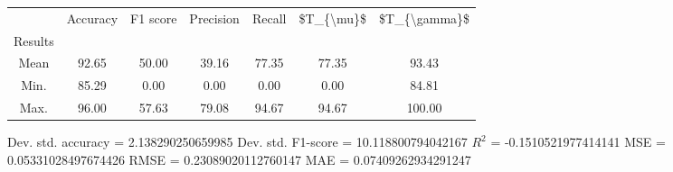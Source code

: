 \begin{tabular}{|c|c|c|c|c|c|c|}
\toprule
{} &  Accuracy &  F1 score &  Precision &  Recall &  \$T\_\{\textbackslash mu\}\$ &  \$T\_\{\textbackslash gamma\}\$ \\
Results &           &           &            &         &            &               \\
\hline
Mean    &     92.65 &     50.00 &      39.16 &   77.35 &      77.35 &         93.43 \\
Min.    &     85.29 &      0.00 &       0.00 &    0.00 &       0.00 &         84.81 \\
Max.    &     96.00 &     57.63 &      79.08 &   94.67 &      94.67 &        100.00 \\
\bottomrule
\end{tabular}

 Dev. std. accuracy = 2.138290250659985
 Dev. std. F1-score = 10.118800794042167
 $R^2$ = -0.1510521977414141
 MSE = 0.05331028497674426
 RMSE = 0.23089020112760147
 MAE = 0.07409262934291247